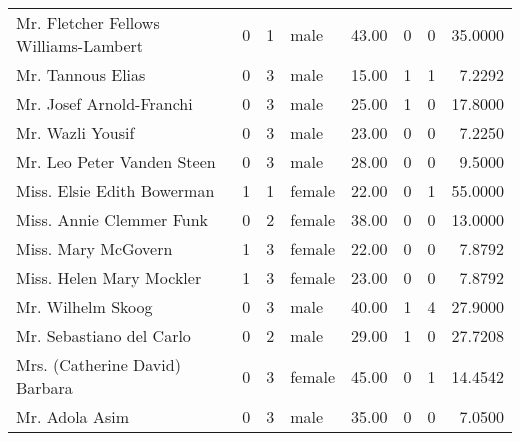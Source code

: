 \begin{tabular}{lrrlrrrr}
Mr. Fletcher Fellows Williams-Lambert              &         0 &       1 &    male &  43.00 &                        0 &                        0 &   35.0000 \\
Mr. Tannous Elias                                  &         0 &       3 &    male &  15.00 &                        1 &                        1 &    7.2292 \\
Mr. Josef Arnold-Franchi                           &         0 &       3 &    male &  25.00 &                        1 &                        0 &   17.8000 \\
Mr. Wazli Yousif                                   &         0 &       3 &    male &  23.00 &                        0 &                        0 &    7.2250 \\
Mr. Leo Peter Vanden Steen                         &         0 &       3 &    male &  28.00 &                        0 &                        0 &    9.5000 \\
Miss. Elsie Edith Bowerman                         &         1 &       1 &  female &  22.00 &                        0 &                        1 &   55.0000 \\
Miss. Annie Clemmer Funk                           &         0 &       2 &  female &  38.00 &                        0 &                        0 &   13.0000 \\
Miss. Mary McGovern                                &         1 &       3 &  female &  22.00 &                        0 &                        0 &    7.8792 \\
Miss. Helen Mary Mockler                           &         1 &       3 &  female &  23.00 &                        0 &                        0 &    7.8792 \\
Mr. Wilhelm Skoog                                  &         0 &       3 &    male &  40.00 &                        1 &                        4 &   27.9000 \\
Mr. Sebastiano del Carlo                           &         0 &       2 &    male &  29.00 &                        1 &                        0 &   27.7208 \\
Mrs. (Catherine David) Barbara                     &         0 &       3 &  female &  45.00 &                        0 &                        1 &   14.4542 \\
Mr. Adola Asim                                     &         0 &       3 &    male &  35.00 &                        0 &                        0 &    7.0500 \\

\end{tabular}
